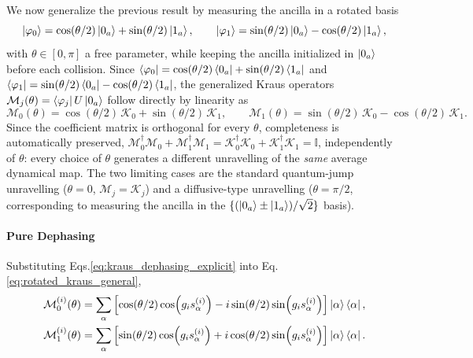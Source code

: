 \documentclass[a4paper,12pt]{article}
\begin{document}
We now generalize the previous result by measuring the ancilla in a rotated basis
\begin{equation}
	\Ket{\varphi_{0}} = \cos(\theta/2)\Ket{0_{a}} + \sin(\theta/2)\Ket{1_{a}}, \qquad
	\Ket{\varphi_{1}} = \sin(\theta/2)\Ket{0_{a}} - \cos(\theta/2)\Ket{1_{a}},
\end{equation}
with $\theta \in [0,\pi]$ a free parameter, while keeping the ancilla initialized in $\Ket{0_{a}}$ before each collision. Since $\Bra{\varphi_{0}} = \cos(\theta/2)\Bra{0_{a}} + \sin(\theta/2)\Bra{1_{a}}$ and $\Bra{\varphi_{1}} = \sin(\theta/2)\Bra{0_{a}} - \cos(\theta/2)\Bra{1_{a}}$, the generalized Kraus operators $\mathcal{M}_{j}(\theta) = \Bra{\varphi_{j}}U\Ket{0_{a}}$ follow directly by linearity as
\begin{equation}
	\mathcal{M}_{0}(\theta) = \cos(\theta/2)\,\mathcal{K}_{0} + \sin(\theta/2)\,\mathcal{K}_{1}, \qquad
	\mathcal{M}_{1}(\theta) = \sin(\theta/2)\,\mathcal{K}_{0} - \cos(\theta/2)\,\mathcal{K}_{1}.
	\label{eq:rotated_kraus_general}
\end{equation}
Since the coefficient matrix is orthogonal for every $\theta$, completeness is automatically preserved, $\mathcal{M}_{0}^{\dagger}\mathcal{M}_{0}+\mathcal{M}_{1}^{\dagger}\mathcal{M}_{1} = \mathcal{K}_{0}^{\dagger}\mathcal{K}_{0}+\mathcal{K}_{1}^{\dagger}\mathcal{K}_{1} = \mathbb{I}$, independently of $\theta$: every choice of $\theta$ generates a different unravelling of the \emph{same} average dynamical map. The two limiting cases are the standard quantum-jump unravelling ($\theta=0$, $\mathcal{M}_{j}=\mathcal{K}_{j}$) and a diffusive-type unravelling ($\theta=\pi/2$, corresponding to measuring the ancilla in the $\{(\Ket{0_{a}}\pm\Ket{1_{a}})/\sqrt{2}\}$ basis).

\paragraph{Pure Dephasing}
Substituting Eqs.\ref{eq:kraus_dephasing_explicit} into Eq.\ref{eq:rotated_kraus_general},
\begin{align}
	\mathcal{M}_{0}^{(i)}(\theta) &= \sum_{\alpha} \left[\cos(\theta/2)\cos\!\left(g_{i}s_{\alpha}^{(i)}\right) - i\sin(\theta/2)\sin\!\left(g_{i}s_{\alpha}^{(i)}\right)\right]\Ket{\alpha}\Bra{\alpha}, \\
	\mathcal{M}_{1}^{(i)}(\theta) &= \sum_{\alpha} \left[\sin(\theta/2)\cos\!\left(g_{i}s_{\alpha}^{(i)}\right) + i\cos(\theta/2)\sin\!\left(g_{i}s_{\alpha}^{(i)}\right)\right]\Ket{\alpha}\Bra{\alpha}.
\end{align}
\end{document}
